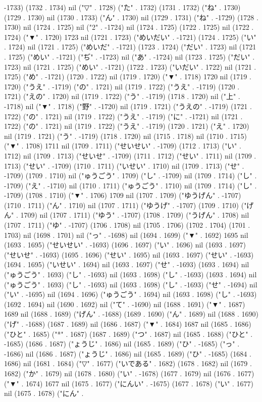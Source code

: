 -1733) (1732 . 1734) nil ("▽" . 1728) ("た" . 1732) (1731 . 1732) ("ね" . 1730) (1729 . 1730) nil (1730 . 1733) ("ん" . 1730) nil (1729 . 1731) ("ね" . -1729) (1728 . 1730) nil (1724 . 1725) nil ("2" . -1724) nil (1724 . 1725) (1722 . 1725) nil (1722 . 1724) ("▼" . 1720) 1723 nil (1721 . 1723) ("めいだい" . -1721) (1724 . 1725) ("い" . 1724) nil (1721 . 1725) ("めいだ" . -1721) (1723 . 1724) ("だい" . 1723) nil (1721 . 1725) ("めい" . -1721) ("ぢ" . -1723) nil ("あ" . -1724) nil (1723 . 1725) ("だい" . 1723) nil (1721 . 1725) ("めい" . -1721) (1722 . 1723) ("いだい" . 1722) nil (1721 . 1725) ("め" . -1721) (1720 . 1722) nil (1719 . 1720) ("▼" . 1718) 1720 nil (1719 . 1720) ("うえ" . -1719) ("の" . 1721) nil (1719 . 1722) ("うえ" . -1719) (1720 . 1721) ("えの" . 1720) nil (1719 . 1722) ("う" . -1719) (1718 . 1720) nil ("上" . -1718) nil ("▼" . 1718) ("野" . -1720) nil (1719 . 1721) ("うえの" . -1719) (1721 . 1722) ("の" . 1721) nil (1719 . 1722) ("うえ" . -1719) ("に" . -1721) nil (1721 . 1722) ("の" . 1721) nil (1719 . 1722) ("うえ" . -1719) (1720 . 1721) ("え" . 1720) nil (1719 . 1721) ("う" . -1719) (1718 . 1720) nil (1715 . 1718) nil (1710 . 1715) ("▼" . 1708) 1711 nil (1709 . 1711) ("せいせい" . -1709) (1712 . 1713) ("い" . 1712) nil (1709 . 1713) ("せいせ" . -1709) (1711 . 1712) ("せい" . 1711) nil (1709 . 1713) ("せい" . -1709) (1710 . 1711) ("いせい" . 1710) nil (1709 . 1713) ("せ" . -1709) (1709 . 1710) nil ("ゅうごう" . 1709) ("し" . -1709) nil (1709 . 1714) ("し" . -1709) ("え" . -1710) nil (1710 . 1711) ("ゅうごう" . 1710) nil (1709 . 1714) ("し" . -1709) (1708 . 1710) ("▼" . 1706) 1709 nil (1707 . 1709) ("ゆうげん" . -1707) (1710 . 1711) ("ん" . 1710) nil (1707 . 1711) ("ゆうげ" . -1707) (1709 . 1710) ("げん" . 1709) nil (1707 . 1711) ("ゆう" . -1707) (1708 . 1709) ("うげん" . 1708) nil (1707 . 1711) ("ゆ" . -1707) (1706 . 1708) nil (1705 . 1706) (1702 . 1704) (1701 . 1703) nil (1698 . 1701) nil ("っ" . -1698) nil (1694 . 1699) ("▼" . 1692) 1695 nil (1693 . 1695) ("せいせい" . -1693) (1696 . 1697) ("い" . 1696) nil (1693 . 1697) ("せいせ" . -1693) (1695 . 1696) ("せい" . 1695) nil (1693 . 1697) ("せい" . -1693) (1694 . 1695) ("いせい" . 1694) nil (1693 . 1697) ("せ" . -1693) (1693 . 1694) nil ("ゅうごう" . 1693) ("し" . -1693) nil (1693 . 1698) ("し" . -1693) (1693 . 1694) nil ("ゅうごう" . 1693) ("し" . -1693) nil (1693 . 1698) ("し" . -1693) ("せ" . -1694) nil ("い" . -1695) nil (1694 . 1696) ("ゅうごう" . 1694) nil (1693 . 1698) ("し" . -1693) (1692 . 1694) nil (1690 . 1692) nil ("て" . -1690) nil (1688 . 1691) ("▼" . 1687) 1689 nil (1688 . 1689) ("げん" . -1688) (1689 . 1690) ("ん" . 1689) nil (1688 . 1690) ("げ" . -1688) (1687 . 1689) nil (1686 . 1687) ("▼" . 1684) 1687 nil (1685 . 1686) ("ひと" . 1685) ("*" . 1687) (1687 . 1689) ("つ" . 1687) nil (1685 . 1688) ("ひと" . -1685) (1686 . 1687) ("ょうじ" . 1686) nil (1685 . 1689) ("ひ" . -1685) ("っ" . -1686) nil (1686 . 1687) ("ょうじ" . 1686) nil (1685 . 1689) ("ひ" . -1685) (1684 . 1686) nil (1681 . 1684) ("▽" . 1677) ("いである" . 1682) (1678 . 1682) nil (1679 . 1682) ("か" . 1679) nil (1678 . 1680) ("い" . -1678) (1677 . 1679) nil (1676 . 1677) ("▼" . 1674) 1677 nil (1675 . 1677) ("にんい" . -1675) (1677 . 1678) ("い" . 1677) nil (1675 . 1678) ("にん" . 